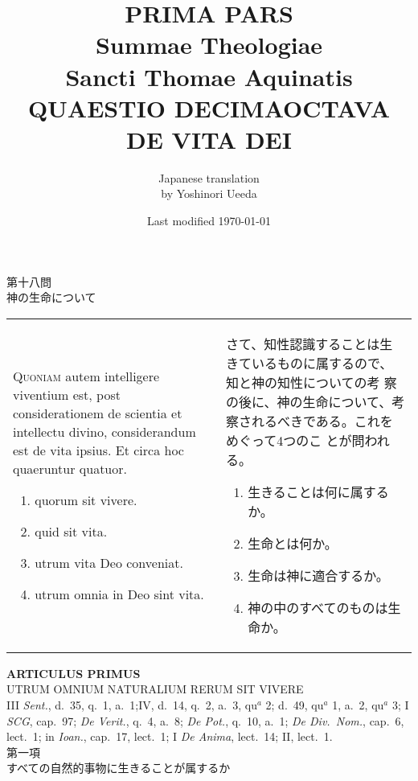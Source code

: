 \documentclass[10pt]{jsarticle} %
\title{{\bf PRIMA PARS}\\{\HUGE Summae Theologiae}\\Sancti Thomae
Aquinatis\\{\sffamily QUAESTIO DECIMAOCTAVA}\\DE VITA DEI}
\author{Japanese translation\\by Yoshinori {\sc Ueeda}}
\date{Last modified \today}
\begin{document}
\maketitle
\pagestyle{fancy}

\begin{center}
{\Large 第十八問\\神の生命について}
\end{center}

\begin{longtable}{p{21em}p{21em}}

{\huge Q}{\scshape uoniam} autem intelligere viventium est, post
 considerationem de scientia et intellectu divino, considerandum est de
 vita ipsius. Et circa hoc quaeruntur quatuor.

\begin{enumerate}
 \item quorum sit vivere.
 \item quid sit vita.
 \item utrum vita Deo conveniat.
 \item utrum omnia in Deo sint vita.
\end{enumerate}
 
&

さて、知性認識することは生きているものに属するので、知と神の知性についての考
 察の後に、神の生命について、考察されるべきである。これをめぐって4つのこ
 とが問われる。
 
\begin{enumerate}
 \item 生きることは何に属するか。
 \item 生命とは何か。
 \item 生命は神に適合するか。
 \item 神の中のすべてのものは生命か。
\end{enumerate}


\end{longtable}

\newpage

\begin{center}
 {\Large {\bf ARTICULUS PRIMUS}}\\
 {\large UTRUM OMNIUM NATURALIUM RERUM SIT VIVERE}\\
 {\footnotesize III {\itshape Sent.}, d.~35, q.~1, a.~1;IV, d.~14, q.~2, a.~3, qu$^a$ 2; d.~49, qu$^a$ 1, a.~2, qu$^a$ 3; I {\itshape SCG}, cap.~97; {\itshape De Verit.}, q.~4, a.~8; {\itshape De Pot.}, q.~10, a.~1; {\itshape De Div.~Nom.}, cap.~6, lect.~1; in {\itshape Ioan.}, cap.~17, lect.~1; I {\itshape De Anima}, lect.~14; II, lect.~1.}\\

 {\Large 第一項\\すべての自然的事物に生きることが属するか}
\end{center}
\end{document}
